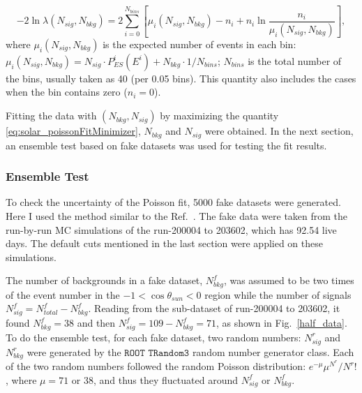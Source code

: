 \begin{equation}\label{eq:solar_poissonFitMinimizer}
-2\ln\mathcal \lambda(N_{sig},N_{bkg})
=2\sum_{i=0}^{N_{bins}}[\mu_i(N_{sig},N_{bkg})-n_i+n_i\ln\frac{n_i}{\mu_i(N_{sig},N_{bkg})}],
\end{equation}
where $\mu_i(N_{sig},N_{bkg})$ is the expected number of events in each bin: $\mu_i(N_{sig},N_{bkg})=N_{sig}\cdot P^i_{ES}(E^i)+N_{bkg}\cdot1/N_{bins}$; $N_{bins}$ is the total number of the bins, usually taken as 40 (per 0.05 bins). This quantity also includes the cases when the bin contains zero ($n_i=0$).

Fitting the data with $(N_{bkg},N_{sig})$ by maximizing the quantity \ref{eq:solar_poissonFitMinimizer}, $N_{bkg}$ and $N_{sig}$ were obtained. In the next section, an ensemble test based on fake datasets was used for testing the fit results.
%
%
\subsubsection{Ensemble Test}
To check the uncertainty of the Poisson fit, 5000 fake datasets were generated. Here I used the method similar to the Ref.~\cite{leta}.
The fake data were taken from the run-by-run MC simulations of the run-200004 to 203602, which has 92.54 live days. The default cuts mentioned in the last section were applied on these simulations.

The number of backgrounds in a fake dataset, $N^f_{bkg}$, was assumed to be two times of the event number in the $-1<\cos\theta_{sun}<0$ region while the number of signals $N^f_{sig}=N^f_{total}-N^f_{bkg}$. Reading from the sub-dataset of run-200004 to 203602, it found $N^f_{bkg}=38$ and then $N^f_{sig}=109-N^f_{bkg}=71$, as shown in Fig.~\ref{half_data}. To do the ensemble test, for each fake dataset, two random numbers: $N^r_{sig}$ and $N^r_{bkg}$ were generated by the $\texttt{ROOT TRandom3}$ random number generator class. Each of the two random numbers followed the random Poisson distribution: $e^{-\mu}\mu^{N^r}/N^r!$, where $\mu=71$ or $38$, and thus they fluctuated around $N^f_{sig}$ or $N^f_{bkg}$.

